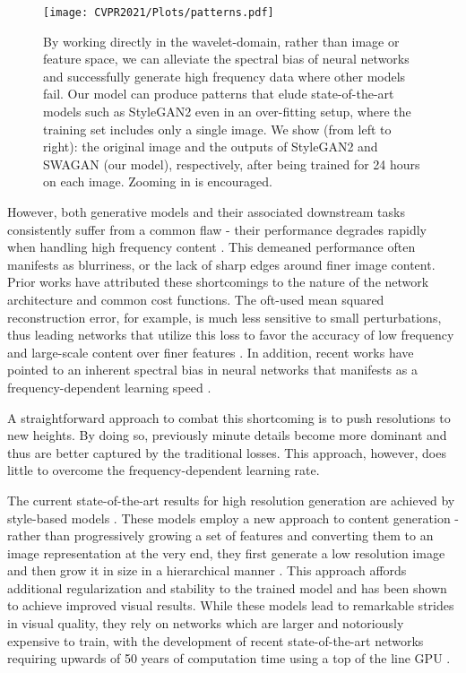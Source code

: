 \documentclass[final]{CVPR2021/cvpr}
\begin{document}
\begin{figure}[t]
\begin{center}
\texttt{[image: CVPR2021/Plots/patterns.pdf]}
\end{center}
   \caption{By working directly in the wavelet-domain, rather than image or feature space, we can alleviate the spectral bias of neural networks and successfully generate high frequency data where other models fail. Our model can produce patterns that elude state-of-the-art models such as StyleGAN2 even in an over-fitting setup, where the training set includes only a single image. We show (from left to right): the original image and the outputs of StyleGAN2 and SWAGAN (our model), respectively, after being trained for 24 hours on each image. Zooming in is encouraged.
   }
\label{fig:overfit}
\end{figure}

However, both generative models and their associated downstream tasks consistently suffer from a common flaw - their performance degrades rapidly when handling high frequency content \citep{durall2020watch,dzanic2019fourier,chen2020ssd}. This demeaned performance often manifests as blurriness, or the lack of sharp edges around finer image content. Prior works have attributed these shortcomings to the nature of the network architecture and common cost functions. The oft-used mean squared reconstruction error, for example, is much less sensitive to small perturbations, thus leading networks that utilize this loss to favor the accuracy of low frequency and large-scale content over finer features \citep{huang2017wavelet}. In addition, recent works have pointed to an inherent spectral bias in neural networks that manifests as a frequency-dependent learning speed \citep{rahaman2019spectral}.

A straightforward approach to combat this shortcoming is to push resolutions to new heights. By doing so, previously minute details become more dominant and thus are better captured by the traditional losses. This approach, however, does little to overcome the frequency-dependent learning rate. 

The current state-of-the-art results for high resolution generation are achieved by style-based models \citep{karras_style-based_2019,karras2020analyzing}. These models employ a new approach to content generation - rather than progressively growing a set of features and converting them to an image representation at the very end, they first generate a low resolution image and then grow it in size in a hierarchical manner \citep{karras2017progressive,karnewar2019msg}. This approach affords additional regularization and stability to the trained model and has been shown to achieve improved visual results. While these models lead to remarkable strides in visual quality, they rely on \mbox{networks} which are larger and 
notoriously expensive to train, with the \mbox{development} of recent state-of-the-art networks requiring upwards of 50 years of computation time using a top of the line GPU \citep{karras2020analyzing}.
\end{document}
